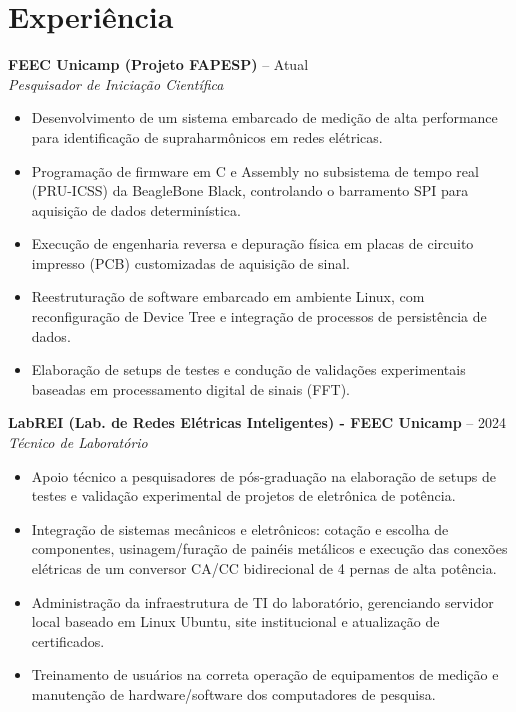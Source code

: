 \documentclass[a4paper,10pt]{article}
\newcommand{\entry}[4]{
  \noindent\textbf{#1} \hfill #2 \\
  \noindent\textit{#3} \hfill \textit{#4} \\
  \vspace{2pt}
}
\begin{document}
\section*{Experiência}

\entry{FEEC Unicamp (Projeto FAPESP)}{\faCalendar {} -- Atual}{Pesquisador de Iniciação Científica}{}
\vspace{-1.6em}
\begin{itemize}
\setlength\itemsep{0em}
\item Desenvolvimento de um sistema embarcado de medição de alta performance para identificação de supraharmônicos em redes elétricas.
\item Programação de firmware em C e Assembly no subsistema de tempo real (PRU-ICSS) da BeagleBone Black, controlando o barramento SPI para aquisição de dados determinística.
\item Execução de engenharia reversa e depuração física em placas de circuito impresso (PCB) customizadas de aquisição de sinal.
\item Reestruturação de software embarcado em ambiente Linux, com reconfiguração de Device Tree e integração de processos de persistência de dados.
\item Elaboração de setups de testes e condução de validações experimentais baseadas em processamento digital de sinais (FFT).
\end{itemize}

\entry{LabREI (Lab. de Redes Elétricas Inteligentes) - FEEC Unicamp}{\faCalendar \space 2022 -- 2024}{Técnico de Laboratório}{}
\vspace{-1.6em}
\begin{itemize}
\setlength\itemsep{0em}
\item Apoio técnico a pesquisadores de pós-graduação na elaboração de setups de testes e validação experimental de projetos de eletrônica de potência.
\item Integração de sistemas mecânicos e eletrônicos: cotação e escolha de componentes, usinagem/furação de painéis metálicos e execução das conexões elétricas de um conversor CA/CC bidirecional de 4 pernas de alta potência.
\item Administração da infraestrutura de TI do laboratório, gerenciando servidor local baseado em Linux Ubuntu, site institucional e atualização de certificados.
\item Treinamento de usuários na correta operação de equipamentos de medição e manutenção de hardware/software dos computadores de pesquisa.
\end{itemize}
\end{document}
